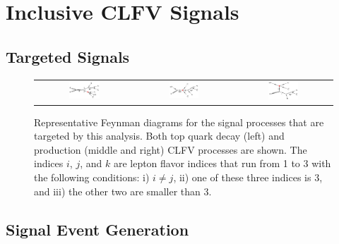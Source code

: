 \chapter{Inclusive CLFV Signals}
\label{chap:Signal}

\section{Targeted Signals}
\label{sec:Target}

 \begin{figure}[tbh!]
 \begin{center}
 \begin{tabular}{ccc}
 \includegraphics[width=0.33\textwidth]{figures/Part4/Signal/TT}&
 \includegraphics[width=0.33\textwidth]{figures/Part4/Signal/ST1}&
 \includegraphics[width=0.33\textwidth]{figures/Part4/Signal/ST2}\\
 \end{tabular}
 \caption{Representative Feynman diagrams for the signal processes that are targeted by this analysis. Both top quark decay (left) and production (middle and right) \ac{CLFV} processes are shown. The indices $i$,  $j$, and $k$ are lepton flavor indices that run from 1 to 3 with the following conditions: i) $i\neq j$, ii) one of these three indices is 3, and iii) the other two are smaller than 3.}
 \label{fig:Target}
 \end{center}
 \end{figure}

\section{Signal Event Generation}
\label{sec:SigGen}

